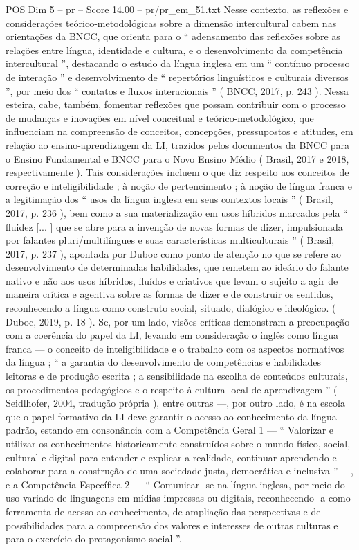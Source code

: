 \begin{textsample}{POS Dim 5 – pr – Score 14.00 – pr/pr\_em\_51.txt}
Nesse contexto, as reflexões e considerações teórico-metodológicas sobre a dimensão intercultural cabem nas orientações da BNCC, que orienta para o “ adensamento das reflexões sobre as relações entre língua, identidade e cultura, e o desenvolvimento da competência intercultural ”, destacando o estudo da língua inglesa em um “ contínuo processo de interação ” e desenvolvimento de “ repertórios linguísticos e culturais diversos ”, por meio dos “ contatos e fluxos interacionais ” ( BNCC, 2017, p. 243 ).
Nessa esteira, cabe, também, fomentar reflexões que possam contribuir com o processo de mudanças e inovações em nível conceitual e teórico-metodológico, que influenciam na compreensão de conceitos, concepções, pressupostos e atitudes, em relação ao ensino-aprendizagem da LI, trazidos pelos documentos da BNCC para o Ensino Fundamental e BNCC para o Novo Ensino Médio ( Brasil, 2017 e 2018, respectivamente ).
Tais considerações incluem o que diz respeito aos conceitos de correção e inteligibilidade ; à noção de pertencimento ; à noção de língua franca e a legitimação dos “ usos da língua inglesa em seus contextos locais ” ( Brasil, 2017, p. 236 ), bem como a sua materialização em usos híbridos marcados pela “ fluidez [... ] que se abre para a invenção de novas formas de dizer, impulsionada por falantes pluri/multilíngues e suas características multiculturais ” ( Brasil, 2017, p. 237 ), apontada por Duboc como ponto de atenção no que se refere ao desenvolvimento de determinadas habilidades, que remetem ao ideário do falante nativo e não aos usos híbridos, fluídos e criativos que levam o sujeito a agir de maneira crítica e agentiva sobre as formas de dizer e de construir os sentidos, reconhecendo a língua como construto social, situado, dialógico e ideológico. ( Duboc, 2019, p. 18 ).
Se, por um lado, visões críticas demonstram a preocupação com a coerência do papel da LI, levando em consideração o inglês como língua franca — o conceito de inteligibilidade e o trabalho com os aspectos normativos da língua ; “ a garantia do desenvolvimento de competências e habilidades leitoras e de produção escrita ; a sensibilidade na escolha de conteúdos culturais, os procedimentos pedagógicos e o respeito à cultura local de aprendizagem ” ( Seidlhofer, 2004, tradução própria ), entre outras —, por outro lado, é na escola que o papel formativo da LI deve garantir o acesso ao conhecimento da língua padrão, estando em consonância com a Competência Geral 1 — “ Valorizar e utilizar os conhecimentos historicamente construídos sobre o mundo físico, social, cultural e digital para entender e explicar a realidade, continuar aprendendo e colaborar para a construção de uma sociedade justa, democrática e inclusiva ” —, e a Competência Específica 2 — “ Comunicar -se na língua inglesa, por meio do uso variado de linguagens em mídias impressas ou digitais, reconhecendo -a como ferramenta de acesso ao conhecimento, de ampliação das perspectivas e de possibilidades para a compreensão dos valores e interesses de outras culturas e para o exercício do protagonismo social ”.

\end{textsample}

